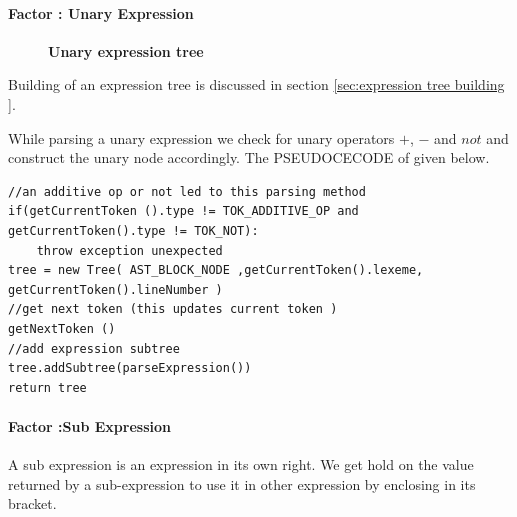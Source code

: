 \paragraph{Factor : Unary Expression}

\label{sec:unary expression factor}
\begin{figure}[H]
    \centering
    \caption{\textbf{Unary expression tree}}
    \label{fig:unary expression building}
\end{figure}

Building of an expression tree is discussed in section \ref{sec:expression tree building }.


While parsing a unary expression we check for unary operators $+$, $-$ and $not$ and construct the unary node accordingly. The PSEUDOCECODE of given below.
\begin{lstlisting}[caption=PSEUDOCODE for building a \textbf{unary expression tree} (\emph{parseUnary()})]
//an additive op or not led to this parsing method 
if(getCurrentToken ().type != TOK_ADDITIVE_OP and getCurrentToken().type != TOK_NOT):
    throw exception unexpected
tree = new Tree( AST_BLOCK_NODE ,getCurrentToken().lexeme, getCurrentToken().lineNumber )
//get next token (this updates current token )
getNextToken ()
//add expression subtree
tree.addSubtree(parseExpression())
return tree
\end{lstlisting}

\paragraph{Factor :Sub Expression}
\label{sec:sub expression factor}

A sub expression is an expression in its own right. We get  hold on the value returned by a sub-expression to use it in other expression by enclosing in its bracket.

